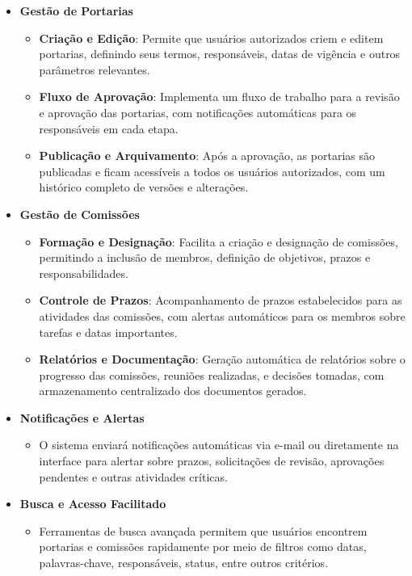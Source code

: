 \documentclass{scrreprt}
\begin{document}
\begin{itemize}
    \item \textbf{Gestão de Portarias}
    \begin{itemize}
        \item \textbf{Criação e Edição}: Permite que usuários autorizados criem e editem portarias, definindo seus termos, responsáveis, datas de vigência e outros parâmetros relevantes.
        \item \textbf{Fluxo de Aprovação}: Implementa um fluxo de trabalho para a revisão e aprovação das portarias, com notificações automáticas para os responsáveis em cada etapa.
        \item \textbf{Publicação e Arquivamento}: Após a aprovação, as portarias são publicadas e ficam acessíveis a todos os usuários autorizados, com um histórico completo de versões e alterações.
    \end{itemize}

    \item \textbf{Gestão de Comissões}
    \begin{itemize}
        \item \textbf{Formação e Designação}: Facilita a criação e designação de comissões, permitindo a inclusão de membros, definição de objetivos, prazos e responsabilidades.
        \item \textbf{Controle de Prazos}: Acompanhamento de prazos estabelecidos para as atividades das comissões, com alertas automáticos para os membros sobre tarefas e datas importantes.
        \item \textbf{Relatórios e Documentação}: Geração automática de relatórios sobre o progresso das comissões, reuniões realizadas, e decisões tomadas, com armazenamento centralizado dos documentos gerados.
    \end{itemize}

    \item \textbf{Notificações e Alertas}
    \begin{itemize}
        \item O sistema enviará notificações automáticas via e-mail ou diretamente na interface para alertar sobre prazos, solicitações de revisão, aprovações pendentes e outras atividades críticas.
    \end{itemize}

    \item \textbf{Busca e Acesso Facilitado}
    \begin{itemize}
        \item Ferramentas de busca avançada permitem que usuários encontrem portarias e comissões rapidamente por meio de filtros como datas, palavras-chave, responsáveis, status, entre outros critérios.
    \end{itemize}


\end{itemize}
\end{document}
